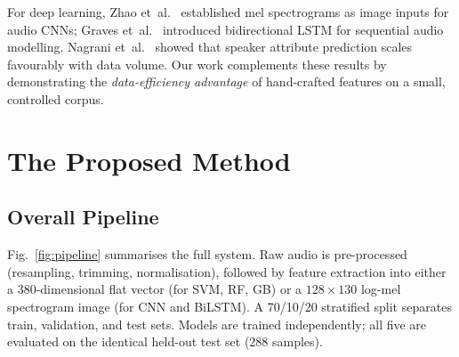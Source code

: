 \documentclass[conference]{IEEEtran}
\begin{document}
For deep learning, Zhao et~al.~\cite{zhao2018sound} established
mel spectrograms as image inputs for audio CNNs; Graves
et~al.~\cite{graves2013speech} introduced bidirectional LSTM for sequential
audio modelling.
Nagrani et~al.~\cite{nagrani2017voxceleb} showed that speaker attribute
prediction scales favourably with data volume.
Our work complements these results by demonstrating the \emph{data-efficiency
advantage} of hand-crafted features on a small, controlled corpus.

\section{The Proposed Method}

\subsection{Overall Pipeline}

Fig.~\ref{fig:pipeline} summarises the full system.
Raw audio is pre-processed (resampling, trimming, normalisation),
followed by feature extraction into either a 380-dimensional flat vector
(for SVM, RF, GB) or a $128\!\times\!130$ log-mel spectrogram image
(for CNN and BiLSTM).
A 70/10/20 stratified split separates train, validation, and test sets.
Models are trained independently; all five are evaluated on the
identical held-out test set (288 samples).
\end{document}
